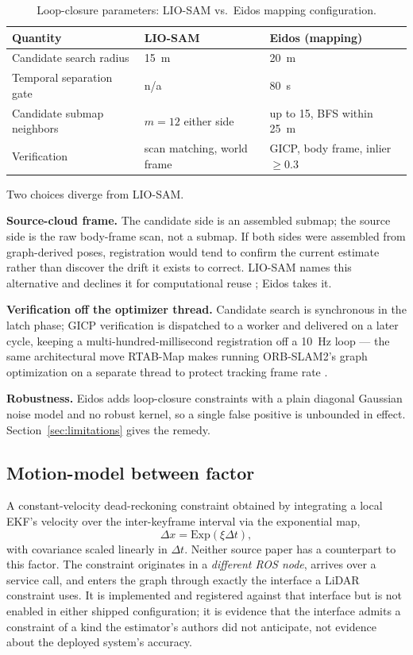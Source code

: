 \documentclass[conference]{IEEEtran}
\begin{document}
\begin{table}[t]
\centering
\footnotesize
\caption{Loop-closure parameters: LIO-SAM vs.\ Eidos mapping configuration.}
\label{tab:loop-closure}
\begin{tabular}{@{}p{2.0cm}p{2.2cm}p{3.4cm}@{}}
\toprule
Quantity & LIO-SAM & Eidos (mapping) \\
\midrule
Candidate search radius & 15~m & 20~m \\
Temporal separation gate & n/a & 80~s \\
Candidate submap neighbors & $m=12$ either side & up to 15, BFS within 25~m \\
Verification & scan matching, world frame & GICP, body frame, inlier $\geq 0.3$ \\
\bottomrule
\end{tabular}
\end{table}

Two choices diverge from LIO-SAM.

\textbf{Source-cloud frame.} The candidate side is an assembled submap; the source side is the raw body-frame scan, not a submap. If both sides were assembled from graph-derived poses, registration would tend to confirm the current estimate rather than discover the drift it exists to correct. LIO-SAM names this alternative and declines it for computational reuse \parencite{shan2020liosam}; Eidos takes it.

\textbf{Verification off the optimizer thread.} Candidate search is synchronous in the latch phase; GICP verification is dispatched to a worker and delivered on a later cycle, keeping a multi-hundred-millisecond registration off a 10~Hz loop --- the same architectural move RTAB-Map makes running ORB-SLAM2's graph optimization on a separate thread to protect tracking frame rate \parencite{labbe2019rtabmap}.

\textbf{Robustness.} Eidos adds loop-closure constraints with a plain diagonal Gaussian noise model and no robust kernel, so a single false positive is unbounded in effect. Section~\ref{sec:limitations} gives the remedy.

\subsection{Motion-model between factor}
\label{sec:motion-model}
A constant-velocity dead-reckoning constraint obtained by integrating a local EKF's velocity over the inter-keyframe interval via the exponential map,
\begin{equation}
\Delta x = \mathrm{Exp}(\xi \Delta t),
\end{equation}
with covariance scaled linearly in $\Delta t$. Neither source paper has a counterpart to this factor. The constraint originates in a \emph{different ROS node}, arrives over a service call, and enters the graph through exactly the interface a LiDAR constraint uses. It is implemented and registered against that interface but is not enabled in either shipped configuration; it is evidence that the interface admits a constraint of a kind the estimator's authors did not anticipate, not evidence about the deployed system's accuracy.
\end{document}
